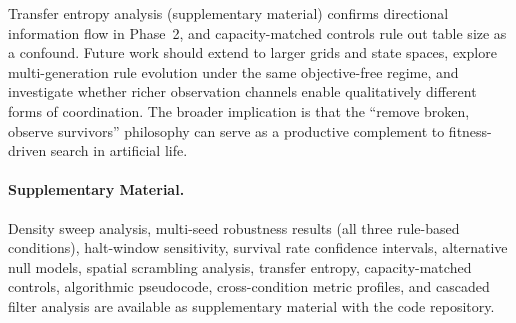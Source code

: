 \documentclass[letterpaper]{article}
\begin{document}
Transfer entropy analysis (supplementary material) confirms directional
information flow in Phase~2, and capacity-matched controls rule out table
size as a confound.  Future work should extend to larger grids and state
spaces, explore multi-generation rule evolution under the same
objective-free regime, and investigate whether richer observation channels
enable qualitatively different forms of coordination.  The broader
implication is that the ``remove broken, observe survivors'' philosophy
can serve as a productive complement to fitness-driven search in
artificial life.

\paragraph{Supplementary Material.}
Density sweep analysis, multi-seed robustness results (all three
rule-based conditions), halt-window sensitivity, survival rate confidence
intervals, alternative null models, spatial scrambling analysis, transfer
entropy, capacity-matched controls, algorithmic pseudocode,
cross-condition metric profiles, and cascaded filter analysis are
available as supplementary material with the code repository.

\footnotesize


\end{document}
